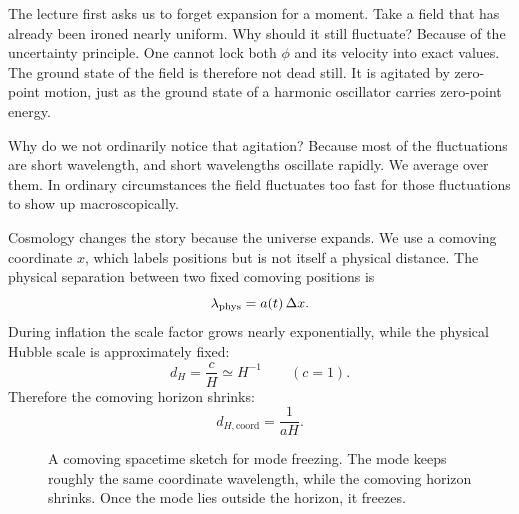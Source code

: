 The lecture first asks us to forget expansion for a moment. Take a field that has already been ironed nearly uniform. Why should it still fluctuate? Because of the uncertainty principle. One cannot lock both \(\phi\) and its velocity into exact values. The ground state of the field is therefore not dead still. It is agitated by zero-point motion, just as the ground state of a harmonic oscillator carries zero-point energy.

Why do we not ordinarily notice that agitation? Because most of the fluctuations are short wavelength, and short wavelengths oscillate rapidly. We average over them. In ordinary circumstances the field fluctuates too fast for those fluctuations to show up macroscopically.

Cosmology changes the story because the universe expands. We use a comoving coordinate \(x\), which labels positions but is not itself a physical distance. The physical separation between two fixed comoving positions is
\begin{equation}
\lambda_{\rm phys}=a(t)\,\Delta x.
\end{equation}
During inflation the scale factor grows nearly exponentially, while the physical Hubble scale is approximately fixed:
\begin{equation}
d_H=\frac{c}{H}\simeq H^{-1}
\qquad (c=1).
\end{equation}
Therefore the comoving horizon shrinks:
\begin{equation}
d_{H,\mathrm{coord}}=\frac{1}{aH}.
\end{equation}

\begin{figure}[t]
\centering
{}
\caption{A comoving spacetime sketch for mode freezing. The mode keeps roughly the same coordinate wavelength, while the comoving horizon shrinks. Once the mode lies outside the horizon, it freezes.}
\end{figure}

